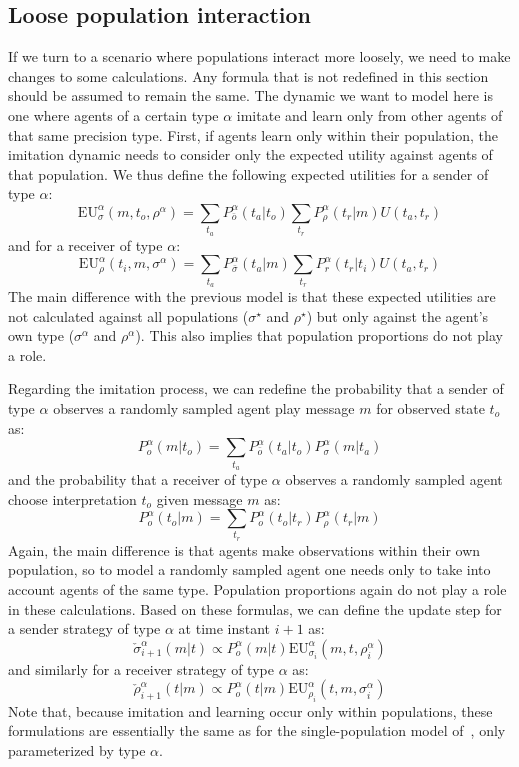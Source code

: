 \documentclass[a4paper]{article}
\begin{document}
\subsection{Loose population interaction}
\label{sec:loose-interaction-model}
If we turn to a scenario where populations interact more loosely, we need to make changes to some calculations.
Any formula that is not redefined in this section should be assumed to remain the same.
The dynamic we want to model here is one where agents of a certain type $\alpha$ imitate and learn only from other agents of that same precision type.
First, if agents learn only within their population, the imitation dynamic needs to consider only the expected utility against agents of that population.
We thus define the following expected utilities for a sender of type $\alpha$:
$$
\text{EU}_{\sigma}^{\alpha}(m,t_{o},\rho^{\alpha})=\sum_{t_{a}}P_{\bar{o}}^{\alpha}(t_{a}|t_{o})\sum_{t_{r}}P_{\rho}^{\alpha}(t_{r}|m)U(t_{a},t_{r})
$$
and for a receiver of type $\alpha$:
$$
\text{EU}_{\rho}^{\alpha}(t_{i},m,\sigma^{\alpha})=\sum_{t_{a}}P_{\bar{\sigma}}^{\alpha}(t_{a}|m)\sum_{t_{r}}P_{r}^{\alpha}(t_{r}|t_{i})U(t_{a},t_{r})
$$
The main difference with the previous model is that these expected utilities are not calculated against all populations ($\sigma^\star$ and $\rho^\star$) but only against the agent's own type ($\sigma^\alpha$ and $\rho^\alpha$).
This also implies that population proportions do not play a role.

Regarding the imitation process, we can redefine the probability that a sender of type $\alpha$ observes a randomly sampled agent play message $m$ for observed state $t_o$ as:
$$
P_{o}^{\alpha}(m|t_{o})=\sum_{t_{a}}P_{\bar{o}}^{\alpha}(t_{a}|t_{o})P_{\sigma}^{\alpha}(m|t_{a})
$$
and the probability that a receiver of type $\alpha$ observes a randomly sampled agent choose interpretation $t_o$ given message $m$ as:
$$
P_{o}^{\alpha}(t_{o}|m)=\sum_{t_{r}}P_{o}^{\alpha}(t_{o}|t_{r})P_{\rho}^{\alpha}(t_{r}|m)
$$
Again, the main difference is that agents make observations within their own population, so to model a randomly sampled agent one needs only to take into account agents of the same type.
Population proportions again do not play a role in these calculations.
Based on these formulas, we can define the update step for a sender strategy of type $\alpha$ at time instant $i+1$ as:
$$
\check{\sigma}_{i+1}^{\alpha}(m|t) \propto P_{o}^{\alpha}(m|t)\text{EU}_{\sigma_{i}}^{\alpha}(m,t,\rho_{i}^{\alpha})
$$
and similarly for a receiver strategy of type $\alpha$ as:
$$
\check{\rho}_{i+1}^{\alpha}(t|m) \propto P_{o}^{\alpha}(t|m)\text{EU}_{\rho_{i}}^{\alpha}(t,m,\sigma_{i}^{\alpha})
$$
Note that, because imitation and learning occur only within populations, these formulations are essentially the same as for the single-population model of~\textcite{franke_vagueness_2017}, only parameterized by type $\alpha$.
\end{document}
